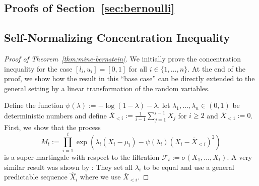 \documentclass[aos]{imsart2}
\theoremstyle{plain}
\theoremstyle{definition}
\newcommand{\xb}{\bar{X}}
\begin{document}
\begin{appendix}
\section{Proofs of Section~\ref{sec:bernoulli}}
\subsection{Self-Normalizing Concentration Inequality}\label{app:self-normalizing-conc-inq}

\begin{proof}[Proof of Theorem~\ref{thm:mine-bernstein}] We initially prove the concentration inequality for the case $[l_i,u_i] = [0,1]$ for all $i \in \{1,\ldots,n\}$. At the end of the proof, we show how the result in this ``base case'' can be directly extended to the general setting by a linear transformation of the random variables.

    Define the function $\psi(\lambda) := -\log(1-\lambda)-\lambda$, let $\lambda_1,\ldots,\lambda_n \in (0,1)$ be deterministic numbers and define $\xb_{<i} := \frac{1}{i-1}\sum_{j=1}^{i-1} X_j$ for $i \geq 2$ and $\xb_{<1}:=0$. First, we show that the process
    \begin{equation*}
        M_t := \prod_{i=1}^t \exp \left(\lambda_i(X_i-\mu_i)-\psi(\lambda_i)(X_i-\xb_{<i})^2\right)
    \end{equation*}
    is a super-martingale with respect to the filtration $\mathcal{F}_t:=\sigma(X_1,\ldots,X_t)$. A very similar result was shown by \citet[Thm.~4]{howard_time-uniform_2021}: They set all $\lambda_i$ to be equal and use a general predictable sequence $\hat{X}_i$ where we use $\xb_{<i}$.


\end{proof}
\end{appendix}
\end{document}
